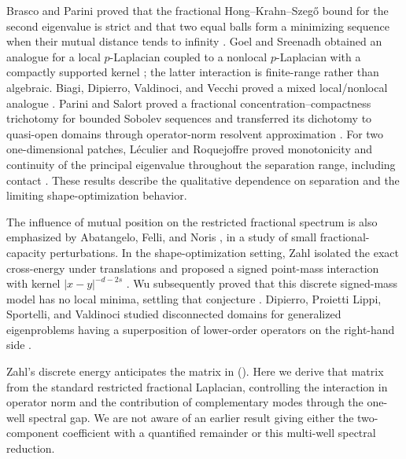 \documentclass[twoside,10pt]{article}
\numberwithin{equation}{section}
\theoremstyle{slbody}
\theoremstyle{definition}
\newcommand{\abs}[1]{\lvert #1\rvert}
\renewcommand{\eqref}[1]{%
  \textup{{\normalfont(\oldstylenums{\ref{#1}}}\normalfont)}}
\begin{document}
Brasco and Parini proved that the fractional Hong--Krahn--Szeg\H{o} bound for
the second eigenvalue is strict and that two equal balls form a minimizing
sequence when their mutual distance tends to infinity
\cite[Theorem~6.2]{BrascoParini2016}.  Goel and Sreenadh obtained an analogue
for a local $p$-Laplacian coupled to a nonlocal $p$-Laplacian with a compactly
supported kernel
\cite[Theorem~1.4]{GoelSreenadh2019}; the latter interaction is finite-range
rather than algebraic.  Biagi, Dipierro, Valdinoci, and Vecchi proved a mixed
local/nonlocal analogue
\cite[Theorem~1.1]{BiagiDipierroValdinociVecchi2023}.  Parini and Salort
proved a fractional concentration--compactness trichotomy for bounded Sobolev
sequences and transferred its dichotomy to quasi-open domains through
operator-norm resolvent approximation
\cite[Theorems~1.1 and~1.2]{PariniSalort2020}.  For two one-dimensional
patches, L\'eculier and Roquejoffre proved monotonicity and continuity of the
principal eigenvalue throughout the separation range, including contact
\cite[Theorem~1]{LeculierRoquejoffre2023}.  These results describe the
qualitative dependence on separation and the limiting shape-optimization
behavior.

The influence of mutual position on the restricted fractional spectrum is
also emphasized by Abatangelo, Felli, and Noris
\cite[arXiv v2, Introduction, p.~3]{AbatangeloFelliNoris2020}, in a study of small
fractional-capacity perturbations.  In the shape-optimization setting, Zahl
isolated the exact cross-energy under translations and proposed a signed
point-mass interaction with kernel $\abs{x-y}^{-d-2s}$
\cite[Section~10, equations~(10.3) and~(10.7), and
Conjecture~10.9]{Zahl2026}.  Wu subsequently proved that this discrete
signed-mass model has no local minima, settling that conjecture
\cite[Introduction]{Wu2026}.  Dipierro, Proietti Lippi, Sportelli, and
Valdinoci studied disconnected domains for generalized eigenproblems having
a superposition of lower-order operators on the right-hand side
\cite[Theorems~1.4--1.7]{DipierroProiettiLippiSportelliValdinoci2026}.

Zahl's discrete energy anticipates the matrix in
\eqref{eq:effective-matrix}.  Here we derive that matrix from the standard
restricted fractional Laplacian, controlling the interaction in operator norm
and the contribution of complementary modes through the one-well spectral
gap.  We are not aware of an earlier result giving either the two-component
coefficient with a quantified remainder or this multi-well spectral reduction.
\end{document}

